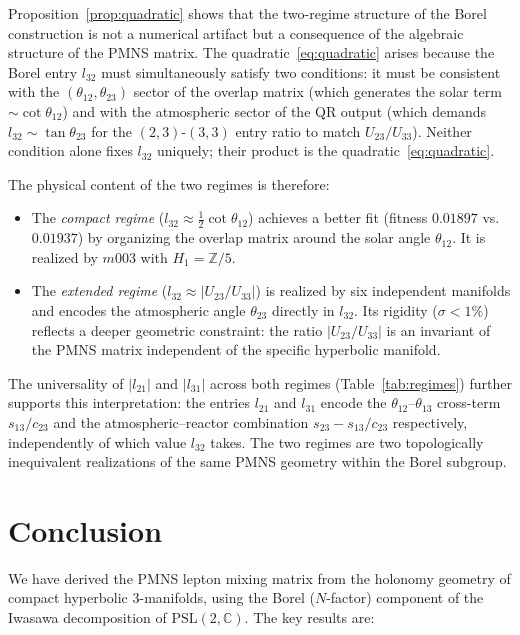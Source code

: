 \documentclass[11pt,a4paper]{article}
\newcommand{\PSL}{\mathrm{PSL}(2,\mathbb{C})}
\begin{document}
Proposition~\ref{prop:quadratic} shows that the two-regime structure
of the Borel construction is not a numerical artifact but a
consequence of the algebraic structure of the PMNS matrix.
The quadratic~\eqref{eq:quadratic} arises because the Borel
entry $l_{32}$ must simultaneously satisfy two conditions:
it must be consistent with the $(\theta_{12}, \theta_{23})$ sector
of the overlap matrix (which generates the solar term
$\sim\cot\theta_{12}$) and with the atmospheric sector of the
QR output (which demands $l_{32} \sim \tan\theta_{23}$ for the
$(2,3)$-$(3,3)$ entry ratio to match $U_{23}/U_{33}$).
Neither condition alone fixes $l_{32}$ uniquely; their product is
the quadratic~\eqref{eq:quadratic}.
 
The physical content of the two regimes is therefore:
\begin{itemize}
\item The \emph{compact regime} ($l_{32} \approx \tfrac{1}{2}\cot\theta_{12}$)
achieves a better fit (fitness $0.01897$ vs.\ $0.01937$) by
organizing the overlap matrix around the solar angle $\theta_{12}$.
It is realized by $m003$ with $H_1 = \mathbb{Z}/5$.
\item The \emph{extended regime} ($l_{32} \approx |U_{23}/U_{33}|$)
is realized by six independent manifolds and encodes the atmospheric
angle $\theta_{23}$ directly in $l_{32}$. Its rigidity ($\sigma < 1\%$)
reflects a deeper geometric constraint: the ratio $|U_{23}/U_{33}|$
is an invariant of the PMNS matrix independent of the specific
hyperbolic manifold.
\end{itemize}
 
The universality of $|l_{21}|$ and $|l_{31}|$ across both regimes
(Table~\ref{tab:regimes}) further supports this interpretation:
the entries $l_{21}$ and $l_{31}$ encode the $\theta_{12}$--$\theta_{13}$
cross-term $s_{13}/c_{23}$ and the atmospheric--reactor combination
$s_{23} - s_{13}/c_{23}$ respectively, independently of which
value $l_{32}$ takes.
The two regimes are two topologically inequivalent realizations of
the same PMNS geometry within the Borel subgroup.

\section{Conclusion}
\label{sec:conclusion}

We have derived the PMNS lepton mixing matrix from the holonomy
geometry of compact hyperbolic 3-manifolds, using the Borel
($N$-factor) component of the Iwasawa decomposition of $\PSL$.
The key results are:
\end{document}

